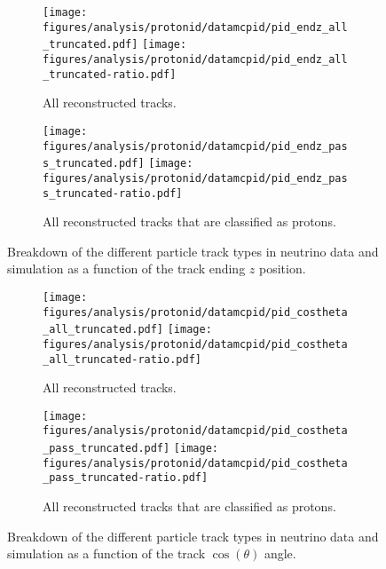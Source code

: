     \begin{figure}[h]
      \centering
      \begin{subfigure}[t]{2.5in}
        \texttt{[image: figures/analysis/protonid/datamcpid/pid\_endz\_all\_truncated.pdf]}
        \texttt{[image: figures/analysis/protonid/datamcpid/pid\_endz\_all\_truncated-ratio.pdf]}
        \caption{All reconstructed tracks.}
      \end{subfigure}
      \hspace{2pt}
      \begin{subfigure}[t]{2.5in}
        \texttt{[image: figures/analysis/protonid/datamcpid/pid\_endz\_pass\_truncated.pdf]}
        \texttt{[image: figures/analysis/protonid/datamcpid/pid\_endz\_pass\_truncated-ratio.pdf]}
        \caption{All reconstructed tracks that are classified as protons.}
      \end{subfigure}
      \caption{Breakdown of the different particle track types in neutrino data
      and simulation as a function of the track ending $z$ position.}
      \label{fig:pidendz}
    \end{figure}
    \begin{figure}[h]
      \centering
      \begin{subfigure}[t]{2.5in}
        \texttt{[image: figures/analysis/protonid/datamcpid/pid\_costheta\_all\_truncated.pdf]}
        \texttt{[image: figures/analysis/protonid/datamcpid/pid\_costheta\_all\_truncated-ratio.pdf]}
        \caption{All reconstructed tracks.}
      \end{subfigure}
      \hspace{2pt}
      \begin{subfigure}[t]{2.5in}
        \texttt{[image: figures/analysis/protonid/datamcpid/pid\_costheta\_pass\_truncated.pdf]}
        \texttt{[image: figures/analysis/protonid/datamcpid/pid\_costheta\_pass\_truncated-ratio.pdf]}
        \caption{All reconstructed tracks that are classified as protons.}
      \end{subfigure}
      \caption{Breakdown of the different particle track types in neutrino data
      and simulation as a function of the track $\cos(\theta)$ angle.}
      \label{fig:pidcostheta}
    \end{figure}
